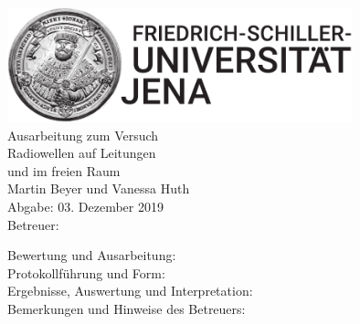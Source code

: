\documentclass[a4paper,twoside,final]{article}
\begin{document}
\setlength{\marginparsep}{2em}
\renewcommand{\theequation}{\arabic{section}.\arabic{equation}}
\renewcommand{\thefigure}{\arabic{section}.\arabic{figure}}
\renewcommand{\thetable}{\arabic{section}.\arabic{table}}

\begin{center}
\thispagestyle{empty}
  \includegraphics[width=0.75\textwidth]{../UniJena_BildWortMarke_black.pdf}\\[4em]
  \Large
  Ausarbeitung zum Versuch\\[2em]
  \Huge
  Radiowellen auf Leitungen\\
  und im freien Raum\\
  \vspace{2cm}
  \Large
  Martin Beyer und Vanessa Huth\\[2em]
  Abgabe: 03. Dezember 2019\\[2em]
  Betreuer: \\[5em]
  \begin{flushleft}
  	Bewertung und Ausarbeitung:\\[2em]
		Protokollführung und Form:\\[1em]
		Ergebnisse, Auswertung und Interpretation:\\[1em]
		Bemerkungen und Hinweise des Betreuers:
  \end{flushleft}
\end{center}
\clearpage

\pagestyle{fancy}
\renewcommand{\headrulewidth}{0pt}
\renewcommand{\footrulewidth}{0.5pt}
\renewcommand{\sectionmark}[1]{\markright{#1}}
\fancyhead[RE,LO]{\rightmark}
\fancyfoot[LE,RO]{\bfseries\thepage}
\renewcommand{\headrulewidth}{0.5pt}
\renewcommand{\footrulewidth}{0.5pt}

\setcounter{equation}{0}
\setcounter{figure}{0}

\tableofcontents
{}%
\newpage
{}
\end{document}
